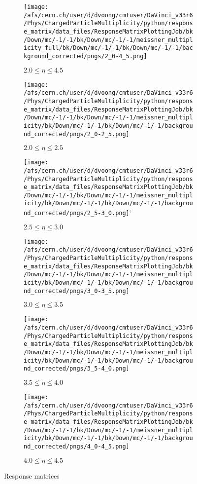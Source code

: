 \begin{figure}
	\centering
	\begin{subfigure}{0.32\textwidth}
		\texttt{[image: /afs/cern.ch/user/d/dvoong/cmtuser/DaVinci\_v33r6/Phys/ChargedParticleMultiplicity/python/response\_matrix/data\_files/ResponseMatrixPlottingJob/bk/Down/mc/-1/-1/bk/Down/mc/-1/-1/meissner\_multiplicity\_full/bk/Down/mc/-1/-1/bk/Down/mc/-1/-1/background\_corrected/pngs/2\_0-4\_5.png]}
		\caption{$2.0 \le \eta \le 4.5$}
	\end{subfigure}
	\begin{subfigure}{0.32\textwidth}
		\texttt{[image: /afs/cern.ch/user/d/dvoong/cmtuser/DaVinci\_v33r6/Phys/ChargedParticleMultiplicity/python/response\_matrix/data\_files/ResponseMatrixPlottingJob/bk/Down/mc/-1/-1/bk/Down/mc/-1/-1/meissner\_multiplicity/bk/Down/mc/-1/-1/bk/Down/mc/-1/-1/background\_corrected/pngs/2\_0-2\_5.png]}
		\caption{$2.0 \le \eta \le 2.5$}
	\end{subfigure}
	\begin{subfigure}{0.32\textwidth}
		\texttt{[image: /afs/cern.ch/user/d/dvoong/cmtuser/DaVinci\_v33r6/Phys/ChargedParticleMultiplicity/python/response\_matrix/data\_files/ResponseMatrixPlottingJob/bk/Down/mc/-1/-1/bk/Down/mc/-1/-1/meissner\_multiplicity/bk/Down/mc/-1/-1/bk/Down/mc/-1/-1/background\_corrected/pngs/2\_5-3\_0.png]}`
		\caption{$2.5 \le \eta \le 3.0$}
	\end{subfigure}
	\begin{subfigure}{0.32\textwidth}
		\texttt{[image: /afs/cern.ch/user/d/dvoong/cmtuser/DaVinci\_v33r6/Phys/ChargedParticleMultiplicity/python/response\_matrix/data\_files/ResponseMatrixPlottingJob/bk/Down/mc/-1/-1/bk/Down/mc/-1/-1/meissner\_multiplicity/bk/Down/mc/-1/-1/bk/Down/mc/-1/-1/background\_corrected/pngs/3\_0-3\_5.png]}
		\caption{$3.0 \le \eta \le 3.5$}
	\end{subfigure}
	\begin{subfigure}{0.32\textwidth}
		\texttt{[image: /afs/cern.ch/user/d/dvoong/cmtuser/DaVinci\_v33r6/Phys/ChargedParticleMultiplicity/python/response\_matrix/data\_files/ResponseMatrixPlottingJob/bk/Down/mc/-1/-1/bk/Down/mc/-1/-1/meissner\_multiplicity/bk/Down/mc/-1/-1/bk/Down/mc/-1/-1/background\_corrected/pngs/3\_5-4\_0.png]}
		\caption{$3.5 \le \eta \le 4.0$}
	\end{subfigure}
	\begin{subfigure}{0.32\textwidth}
		\texttt{[image: /afs/cern.ch/user/d/dvoong/cmtuser/DaVinci\_v33r6/Phys/ChargedParticleMultiplicity/python/response\_matrix/data\_files/ResponseMatrixPlottingJob/bk/Down/mc/-1/-1/bk/Down/mc/-1/-1/meissner\_multiplicity/bk/Down/mc/-1/-1/bk/Down/mc/-1/-1/background\_corrected/pngs/4\_0-4\_5.png]}
		\caption{$4.0 \le \eta \le 4.5$}
	\end{subfigure}
	\caption{Response matrices}
	\label{fig: background corrected response matrices}
\end{figure}

